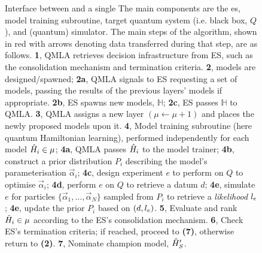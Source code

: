 \begin{figure}
\begin{center}
\begin{tikzpicture}[node distance=2.25cm]
    \end{tikzpicture}
    \end{center}
    
    \caption[Interface between \gls{qmla} and a single ]{
        Interface between  and a single 
        The main components are the \gls{es}, model training subroutine, target quantum system (i.e. black box, $Q$), 
        and (quantum) simulator. 
        The main steps of the algorithm, shown in red with arrows denoting data transferred during that step, are as follows.
        \textbf{1}, QMLA retrieves decision infrastructure from ES, such as the consolidation mechanism and termination criteria.
        \textbf{2}, models are designed/spawned; 
        \textbf{2a}, QMLA signals to ES requesting a set of models, passing the results of the previous layers' models if appropriate.
        \textbf{2b}, ES spawns new models, $\mathbb{H}$;
        \textbf{2c}, ES passes $\mathbb{H}$ to QMLA. 
        \textbf{3}, QMLA assigns a new layer $(\mu \gets \mu + 1)$ and places the newly proposed models upon it.
        \textbf{4}, Model training subroutine (here quantum Hamiltonian learning), performed independently for each model $\hi \in \mu$; 
        \textbf{4a}, QMLA passes $\hi$ to the model trainer; 
        \textbf{4b}, construct a prior distribution $P_i$ describing the model's parameterisation $\vec{\alpha}_i$;
        \textbf{4c}, design experiment $e$ to perform on $Q$ to optimise $\vec{\alpha}_i$;
        \textbf{4d}, perform $e$ on $Q$ to retrieve a datum $d$;
        \textbf{4e}, simulate $e$ for particles $\{ \vec{\alpha}_1, \dots , \vec{\alpha}_N \}$ 
            sampled from $P_i$ to retrieve a \emph{likelihood} $\lk_{e}$;
        \textbf{4e}, update the prior $P_i$ based on $(d, \lk_{e})$.
        \textbf{5}, Evaluate and rank $\hi \in \mu$ according to the ES's consolidation mechanism.
        \textbf{6}, Check ES's termination criteria; if reached, proceed to \textbf{(7)}, otherwise return to \textbf{(2)}.
        \textbf{7}, Nominate champion model, $\hp_{S}$.        
    }
    \label{fig:qmla_flow}
\end{figure}

   
